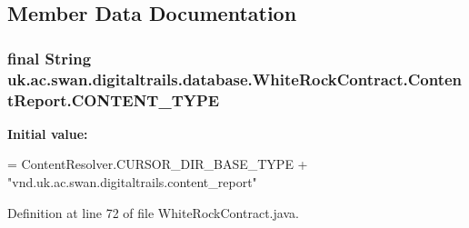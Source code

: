 \subsection{Member Data Documentation}
\hypertarget{classuk_1_1ac_1_1swan_1_1digitaltrails_1_1database_1_1_white_rock_contract_1_1_content_report_aa265b8b8f750b72307aff0fdd0e24d6d}{
\subsubsection[{C\+O\+N\+T\+E\+N\+T\+\_\+\+T\+Y\+P\+E}]{\setlength{\rightskip}{0pt plus 5cm}final String uk.\+ac.\+swan.\+digitaltrails.\+database.\+White\+Rock\+Contract.\+Content\+Report.\+C\+O\+N\+T\+E\+N\+T\+\_\+\+T\+Y\+P\+E\hspace{0.3cm}{\ttfamily [static]}}}\label{classuk_1_1ac_1_1swan_1_1digitaltrails_1_1database_1_1_white_rock_contract_1_1_content_report_aa265b8b8f750b72307aff0fdd0e24d6d}
{\bfseries Initial value\+:}
\begin{DoxyCode}
= ContentResolver.CURSOR\_DIR\_BASE\_TYPE +
                \textcolor{stringliteral}{"vnd.uk.ac.swan.digitaltrails.content\_report"}
\end{DoxyCode}


Definition at line 72 of file White\+Rock\+Contract.\+java.

